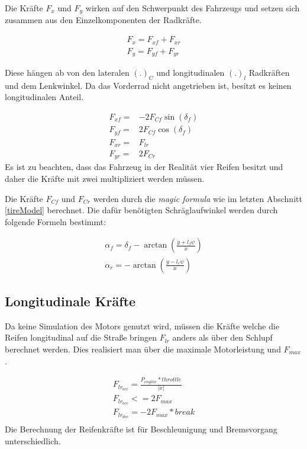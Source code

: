 \documentclass{like}
\begin{document}
Die Kräfte \(F_{x}\) und \(F_{y}\) wirken auf den Schwerpunkt des Fahrzeugs und setzen sich zusammen aus den Einzelkomponenten der Radkräfte.

\begin{eqnarray}
F_x = F_{xf} + F_{xr} \\
F_y = F_{yf} + F_{yr}
\end{eqnarray}

Diese hängen ab von den lateralen \((.)_C\) und longitudinalen \((.)_l\)    Radkräften und dem Lenkwinkel. Da das Vorderrad nicht angetrieben ist, besitzt es keinen longitudinalen Anteil. 

\begin{eqnarray}
F_{xf} =& - 2 F_{Cf} \sin(\delta_f) \\
F_{yf} =& 2 F_{Cf} \cos(\delta_f) \\
F_{xr} =&   F_{lr} \\
F_{yr} =& 2 F_{Cr}
\end{eqnarray}
Es ist zu beachten, dass das Fahrzeug in der Realität vier Reifen besitzt und daher die Kräfte mit zwei multipliziert werden müssen.


Die Kräfte \(F_{Cf}\) und \(F_{Cr}\) werden durch die \textit{magic formula} wie im letzten Abschnitt \ref{tireModel} berechnet.
Die dafür benötigten Schräglaufwinkel werden durch folgende Formeln bestimmt:

\begin{eqnarray}
\alpha_f = \delta_f - \arctan(\frac{\dot{y} + l_f \dot{\psi}}{\dot{x}}) \\
\alpha_r = - \arctan(\frac{\dot{y} - l_r \dot{\psi}}{\dot{x}})
\end{eqnarray}

\subsection*{Longitudinale Kräfte}
Da keine Simulation des Motors genutzt wird, müssen die Kräfte welche die Reifen longitudinal auf die Straße bringen \(F_{lr}\) anders als über den Schlupf berechnet werden.
Dies realisiert man über die maximale Motorleistung und \(F_{max}\).

\begin{eqnarray}
F_{lr_{acc}} = \frac{P_{engine} * throttle }{|\dot{x}|} \label{long_dyn_engine}\\
F_{lr_{acc}} <= 2 F_{max} \label{long_dyn_max}\\
F_{lr_{dec}} = - 2 F_{max} * break\\
\end{eqnarray}
Die Berechnung der Reifenkräfte ist für Beschleunigung und Bremsvorgang unterschiedlich.
\end{document}
